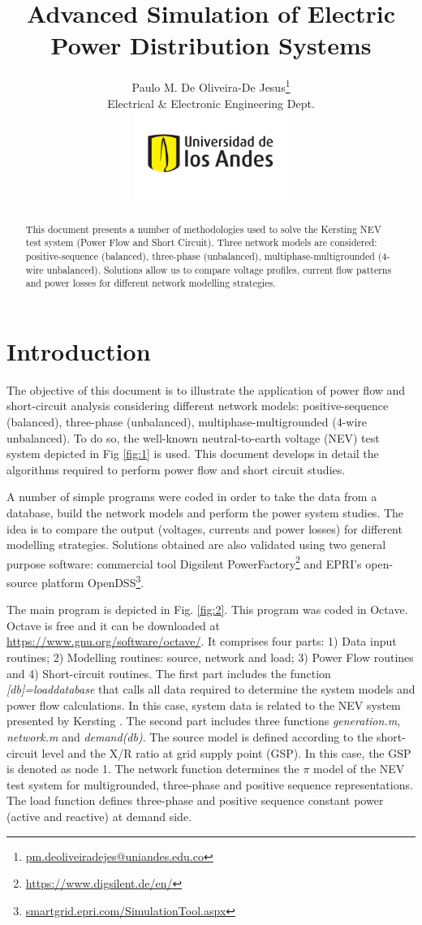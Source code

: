 \documentclass[12pt]{article}
\title{Advanced Simulation of Electric \\ Power Distribution Systems}
\author{Paulo M. De Oliveira-De Jesus\thanks{\url{pm.deoliveiradejes@uniandes.edu.co}} \\
Electrical \& Electronic Engineering Dept.\\
 \includegraphics[width=5cm]{imagenes/logo}}
\begin{document}
\maketitle
\begin{abstract}
This document presents a number of methodologies used to solve the Kersting NEV test system (Power Flow and Short Circuit).
Three network models are considered: positive-sequence (balanced), three-phase (unbalanced), multiphase-multigrounded (4-wire unbalanced).  Solutions allow us to compare voltage profiles, current flow patterns and power losses for different network modelling strategies.
\end{abstract}


\section{Introduction}
\setcounter{equation}{0}

The objective of this document is to illustrate the application of power flow and short-circuit analysis considering different network models:  positive-sequence (balanced), three-phase (unbalanced), multiphase-multigrounded (4-wire unbalanced). To do so, the well-known neutral-to-earth voltage (NEV) test system depicted in Fig \ref{fig:1} is used. This document develops in detail the algorithms required to perform power flow and short circuit studies. 

A number of simple programs were coded in order to take the data from a database, build the network models and perform the power system studies. The idea is to compare the output (voltages, currents and power losses) for different modelling strategies. Solutions obtained are also validated using two general purpose software: commercial tool Digsilent PowerFactory\footnote{\url{https://www.digsilent.de/en/}} and EPRI's open-source platform OpenDSS\footnote{\url{smartgrid.epri.com/SimulationTool.aspx}}.

The main program is depicted in Fig. \ref{fig:2}. This program was coded in Octave. Octave is free and it can be downloaded at \url{https://www.gnu.org/software/octave/}. It comprises four parts: 1) Data input routines;
  2) Modelling routines: source, network and load; 3) Power Flow routines and 4) Short-circuit routines.
The first part includes the function {\em [db]=loaddatabase} that calls all data required to determine the system models and power flow calculations. In this case, system data is related to the NEV system presented by Kersting \cite{1}. The second part includes three functions  {\em generation.m},  {\em network.m} and  {\em demand(db)}. The source model is defined according to the short-circuit level and the X/R ratio at grid supply point (GSP). In this case, the GSP is denoted as node 1. The network function determines the $\pi$ model of the NEV test system for multigrounded, three-phase and positive sequence representations. The load function defines three-phase and positive sequence constant power (active and reactive) at demand side.
\end{document}
